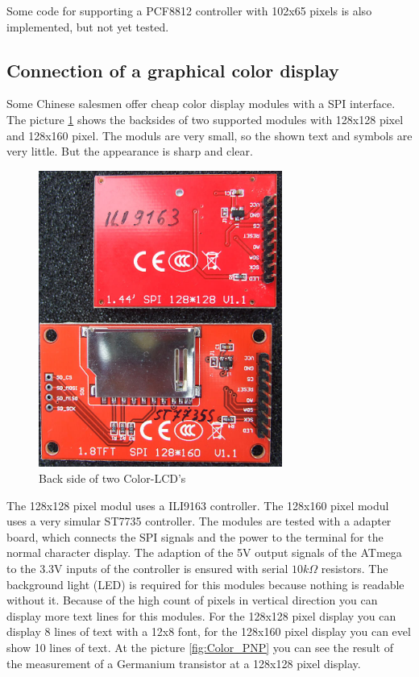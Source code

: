 Some code for supporting a PCF8812 controller with 102x65 pixels is also implemented,
but not yet tested.

\subsection{Connection of a graphical color display}

Some Chinese salesmen offer cheap color display modules with a SPI interface.
The picture \ref{fig:Color_both} shows the backsides of two supported modules with 128x128 pixel
and 128x160 pixel. 
The moduls are very small, so the shown text and symbols are very little.
But the appearance is sharp and clear.

\begin{figure}[H]
\centering
\includegraphics[width=8cm]{../PNG/Color_ILI9163_ST7735.jpg}
\caption{Back side of two Color-LCD's}
\label{fig:Color_both}
\end{figure}

The 128x128 pixel modul uses a ILI9163 controller.
The 128x160 pixel modul uses a very simular ST7735 controller.
The modules are tested with a adapter board, which connects the
SPI signals and the power to the terminal for the normal character display.
The adaption of the 5V output signals of the ATmega to the 3.3V inputs of the controller
is ensured with serial \(10 k\Omega\) resistors.
The background light (LED) is required for this modules because nothing is readable without it.
Because of the high count of pixels in vertical direction you can display more text lines for this modules.
For the 128x128 pixel display you can display 8 lines of text with a 12x8 font,
for the 128x160 pixel display you can evel show 10 lines of text.
At the picture \ref{fig:Color_PNP} you can see the result of the measurement of a Germanium transistor
at a 128x128 pixel display.

